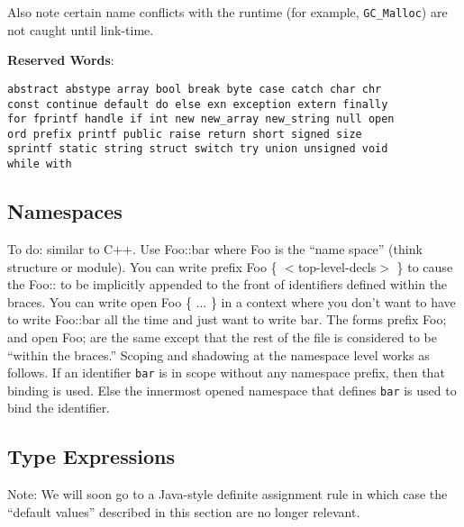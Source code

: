 \documentclass[titlepage,10pt]{article}
\begin{document}
Also note certain name conflicts with the runtime (for example,
\texttt{GC{\_}Malloc}) are not caught until link-time.

\textbf{Reserved Words}:


\begin{verbatim}
abstract abstype array bool break byte case catch char chr 
const continue default do else exn exception extern finally 
for fprintf handle if int new new_array new_string null open
ord prefix printf public raise return short signed size 
sprintf static string struct switch try union unsigned void 
while with
\end{verbatim}


\subsection{Namespaces}

To do:  similar to C++.  Use Foo::bar where Foo is the ``name space''
(think structure or module).  You can write prefix Foo \{
$<$top-level-decls$>$ \} to cause the Foo:: to be implicitly appended to the
front of identifiers defined within the braces.  You can write open Foo
\{ ... \} in a context where you don't want to have to write Foo::bar
all the time and just want to write bar.   The forms prefix Foo; and
open Foo; are the same except that the rest of the file is considered to
be ``within the braces.''   Scoping and shadowing at the namespace level
works as follows.  If an identifier \texttt{bar} is in scope without any
namespace prefix, then that binding is used.  Else the innermost opened
namespace that defines \texttt{bar} is used to bind the identifier.


\subsection{Type Expressions\label{types}}

Note: We will soon go to a Java-style definite assignment rule in which
case the ``default values'' described in this section are no longer
relevant.
\end{document}
